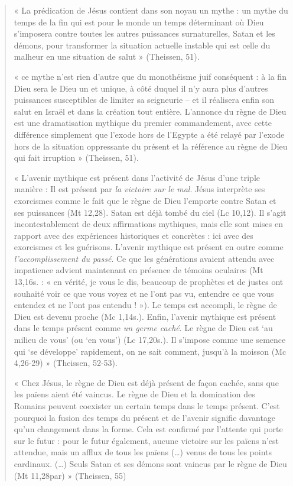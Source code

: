\begin{quote}
    

« La prédication de Jésus contient dans son noyau un mythe : un mythe du
temps de la fin qui est pour le monde un temps déterminant où Dieu
s'imposera contre toutes les autres puissances surnaturelles, Satan et
les démons, pour transformer la situation actuelle instable qui est
celle du malheur en une situation de salut » (Theissen, 51).

« ce mythe n'est rien d'autre que du monothéisme juif conséquent : à la
fin Dieu sera le Dieu un et unique, à côté duquel il n'y aura plus
d'autres puissances susceptibles de limiter sa seigneurie -- et il
réalisera enfin son salut en Israël et dans la création tout entière.
L'annonce du règne de Dieu est une dramatisation mythique du premier
commandement, avec cette différence simplement que l'exode hors de
l'Egypte a été relayé par l'exode hors de la situation oppressante du
présent et la référence au règne de Dieu qui fait irruption » (Theissen,
51).

« L'avenir mythique est présent dans l'activité de Jésus d'une triple
manière : Il est présent par \emph{la victoire sur le mal}. Jésus
interprète ses exorcismes comme le fait que le règne de Dieu l'emporte
contre Satan et ses puissances (Mt 12,28). Satan est déjà tombé du ciel
(Lc 10,12). Il s'agit incontestablement de deux affirmations mythiques,
mais elle sont mises en rapport avec des expériences historiques et
concrètes : ici avec des exorcismes et les guérisons. L'avenir mythique
est présent en outre comme \emph{l'accomplissement du passé}. Ce que les
générations avaient attendu avec impatience advient maintenant en
présence de témoins oculaires (Mt 13,16s. : « en vérité, je vous le dis,
beaucoup de prophètes et de justes ont souhaité voir ce que vous voyez
et ne l'ont pas vu, entendre ce que vous entendez et ne l'ont pas
entendu ! »). Le temps est accompli, le règne de Dieu est devenu proche
(Mc 1,14s.). Enfin, l'avenir mythique est présent dans le temps présent
comme \emph{un germe caché}. Le règne de Dieu est `au milieu de vous'
(ou `en vous') (Lc 17,20s.). Il s'impose comme une semence qui `se
développe' rapidement, on ne sait comment, jusqu'à la moisson (Mc
4,26-29) » (Theissen, 52-53).

« Chez Jésus, le règne de Dieu est déjà présent de façon cachée, sans
que les païens aient été vaincus. Le règne de Dieu et la domination des
Romains peuvent coexister un certain temps dans le temps présent. C'est
pourquoi la fusion des temps du présent et de l'avenir signifie
davantage qu'un changement dans la forme. Cela est confirmé par
l'attente qui porte sur le futur : pour le futur également, aucune
victoire sur les païens n'est attendue, mais un afflux de tous les
païens (\ldots) venus de tous les points cardinaux. (\ldots) Seuls Satan
et ses démons sont vaincus par le règne de Dieu (Mt 11,28par) »
(Theissen, 55)


\end{quote}
